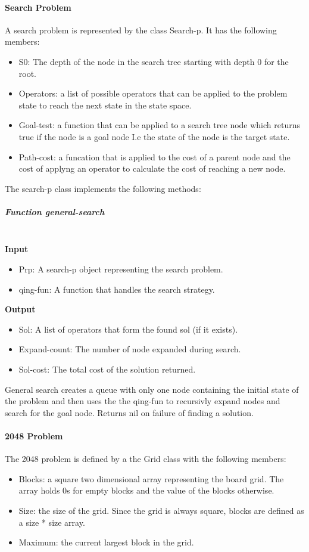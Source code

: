 \documentclass[paper=a4, fontsize=11pt]{scrartcl}
\numberwithin{equation}{section}		%
\numberwithin{figure}{section}			%
\numberwithin{table}{section}				%
\begin{document}
\paragraph{Search Problem}
A search problem is represented by the class Search-p. It has the following members:
\begin{itemize}
	\item{S0:} The depth of the node in the search tree starting with depth 0 for the root.
    \item{Operators:} a list of possible operators that can be applied to the problem state to reach the next state in the state space.
	\item{Goal-test:} a function that can be applied to a search tree node which returns true if the node is a goal node I.e the state of the node is the target state.	
	\item{Path-cost:} a funcation that is applied to the cost of a parent node and the cost of applyng an operator to calculate the cost of reaching a new node.
\end{itemize}

The search-p class implements the following methods: 

\subparagraph{Function general-search} \mbox{} \\
\noindent\textbf{Input}
\begin{itemize}
    \item{Prp:} A search-p object representing the search problem.
    \item{qing-fun:} A function that handles the search strategy.
\end{itemize}
\noindent\textbf{Output}
\begin{itemize}
    \item{Sol:} A list of operators that form the found sol (if it exists).
    \item{Expand-count:} The number of node expanded during search.
    \item{Sol-cost:} The total cost of the solution returned.
\end{itemize}
General search creates a queue with only one node containing the initial state of the problem and then uses the the qing-fun to recursivly expand nodes and search for the goal node. Returns nil on failure of finding a solution.

\paragraph{2048 Problem}
The 2048 problem is defined by a the Grid class with the following members:
\begin{itemize}
    \item{Blocks:} a square two dimensional array representing the board grid. The array holds 0s for empty blocks and the value of the blocks otherwise.
    \item{Size:} the size of the grid. Since the grid is always square, blocks are defined as a size * size array.
    \item{Maximum:} the current largest block in the grid.
\end{itemize}
\end{document}
